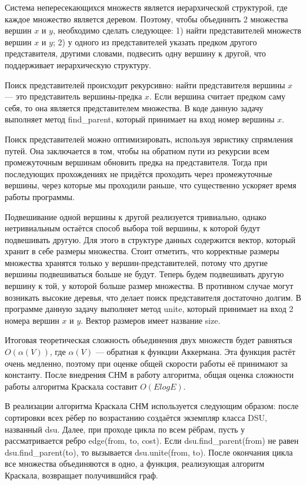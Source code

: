 	Система непересекающихся множеств является иерархической структурой, где каждое множество является деревом. Поэтому, чтобы объединить 2 множества вершин $x$ и $y$, необходимо сделать следующее:
	1) найти представителей множеств вершин $x$ и $y$;
	2) у одного из представителей указать предком другого представителя, другими словами, подвесить одну вершину к другой, что поддерживает иерархическую структуру.
	
	Поиск представителей происходит рекурсивно: найти представителя вершины $x$ --- это представитель вершины-предка $x$. Если вершина считает предком саму себя, то она является представителем множества. В коде данную задачу выполняет метод find\_parent, который принимает на вход номер вершины $x$.
	
	Поиск представителей можно оптимизировать, используя эвристику спрямления путей. Она заключается в том, чтобы на обратном пути из рекурсии всем промежуточным вершинам обновить предка на представителя. Тогда при последующих прохождениях не придётся проходить через промежуточные вершины, через которые мы проходили раньше, что существенно ускоряет время работы программы.
	
	Подвешивание одной вершины к другой реализуется тривиально, однако нетривиальным остаётся способ выбора той вершины, к которой будут подвешивать другую. Для этого в структуре данных содержится вектор, который хранит в себе размеры множества. Стоит отметить, что корректные размеры множества хранятся только у вершин-представителей, потому что другие вершины подвешиваться больше не будут. Теперь будем подвешивать другую вершину к той, у которой больше размер множества. В противном случае могут возникать высокие деревья, что делает поиск представителя достаточно долгим. В программе данную задачу выполняет метод unite, который принимает на вход 2 номера вершин $x$ и $y$. Вектор размеров имеет название size. 
	
	Итоговая теоретическая сложность объединения двух множеств будет равняться $O(\alpha (V))$, где $\alpha (V)$ --- обратная к функции Аккермана. Эта функция растёт очень медленно, поэтому при оценке общей скорости работы её принимают за константу. После внедрения СНМ в работу алгоритма, общая оценка сложности работы алгоритма Краскала составит $O(E log E)$.
	
	В реализации алгоритма Краскала СНМ используется следующим образом: после сортировки всех рёбер по возрастанию создаётся экземпляр класса DSU, названный dsu. Далее, при проходе цикла по всем рёбрам, пусть у рассматривается ребро edge(from, to, cost). Если dsu.find\_parent(from) не равен dsu.find\_parent(to), то вызывается dsu.unite(from, to). После окончания цикла все множества объединяются в одно, а функция, реализующая алгоритм Краскала, возвращает получившийся граф.
	
